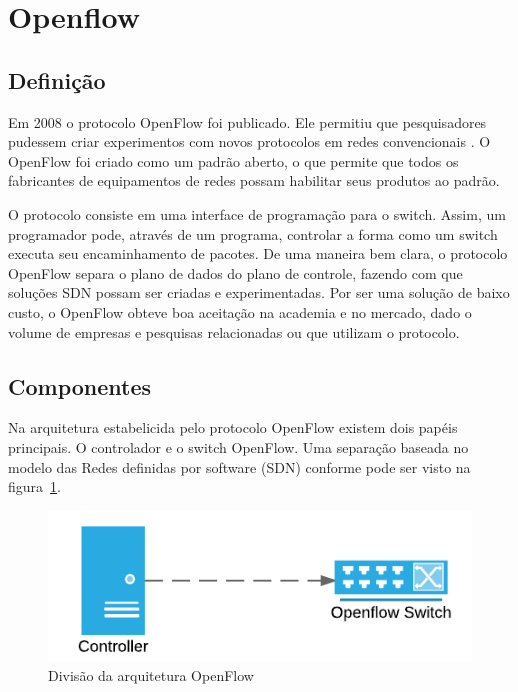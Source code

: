 \section{Openflow}



\subsection{Definição}

Em 2008 o protocolo OpenFlow foi publicado. Ele permitiu que pesquisadores
pudessem criar experimentos com novos protocolos em redes convencionais
\citep{nick2008openflow}.
O OpenFlow foi criado como um padrão aberto, o que permite que todos os 
fabricantes de equipamentos de redes possam habilitar seus produtos ao 
padrão.

O protocolo consiste em uma interface de programação para o switch. 
Assim, um programador pode, através de um programa, controlar a forma como 
um switch executa seu encaminhamento de pacotes. 
De uma maneira bem clara, o protocolo OpenFlow separa o plano de dados
do plano de controle, fazendo com que soluções SDN possam ser criadas 
e experimentadas.
Por ser uma solução de baixo custo, o OpenFlow obteve boa aceitação na 
academia e no mercado, dado o volume de empresas e pesquisas relacionadas
ou que utilizam o protocolo.

\subsection{Componentes}

Na arquitetura estabelicida pelo protocolo OpenFlow existem dois papéis
principais.
O controlador e o switch OpenFlow. 
Uma separação baseada no modelo das Redes definidas por software (SDN)
conforme pode ser visto na figura~\ref{fig:of-arch}.

\begin{figure}[h!]
    \centering
    \label{fig:of-arch}
    \includegraphics{img/openflow-architecture}
    \caption{Divisão da arquitetura OpenFlow}
\end{figure}

